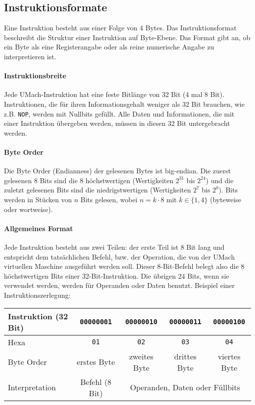 \subsection{Instruktionsformate}
\label{subsec:Instruktionsformate}

Eine Instruktion besteht aus einer Folge von 4 Bytes.
Das \gls{Instruktionsformat} beschreibt die Struktur einer Instruktion auf
Byte-Ebene. Das Format gibt an, ob ein Byte als eine Registerangabe oder als reine
numerische Angabe zu interpretieren ist.

\paragraph{Instruktionsbreite}
Jede UMach-Instruktion hat eine feste Bitlänge von 32 Bit (4 mal 8 Bit).
Instruktionen, die für ihren
Informationsgehalt weniger als 32 Bit brauchen, wie z.B. \texttt{NOP},
werden mit Nullbits gefüllt. Alle Daten und Informationen, die mit einer
Instruktion übergeben werden, müssen in diesen 32 Bit untergebracht werden.

\paragraph{Byte Order}
Die Byte Order (Endianness) der gelesenen \glspl{Byte} ist
big-endian. Die zuerst gelesenen 8 Bits sind die 8 höchstwertigen (Wertigkeiten
$2^{31}$ bis $2^{24}$) und die zuletzt gelesenen Bits sind die niedrigstwertigen
(Wertigkeiten $2^{7}$ bis $2^{0}$). Bits werden in Stücken von $n$ Bits gelesen,
wobei $n = k \cdot 8$ mit $k \in \{1, 4\}$ (byteweise oder wortweise).

\paragraph{Allgemeines Format}
Jede \gls{Instruktion} besteht aus zwei Teilen: der erste Teil ist
8 Bit lang und entspricht dem tatsächlichen \gls{Befehl}, bzw. der Operation,
die von der UMach virtuellen Maschine ausgeführt werden soll.
Dieser 8-Bit-Befehl belegt also die 8 höchstwertigen Bits einer
32-Bit-Instruktion.  Die übrigen 24 Bits, wenn sie verwendet werden, werden
für Operanden oder Daten benutzt. Beispiel einer Instruktionszerlegung:

\begin{center}
  \begin{tabular}{|l|*{4}{c|}}
    \hline
    Instruktion (32 Bit) &
    \texttt{00000001} & \texttt{00000010} & \texttt{00000011} & \texttt{00000100}
    \\\hline
    Hexa          &
    \texttt{01}   & \texttt{02}   & \texttt{03}   & \texttt{04}
    \\\hline
    Byte Order    &
    erstes Byte   & zweites Byte  & drittes Byte  & viertes Byte
    \\\hline
    Interpretation &
    Befehl (8 Bit) &  \multicolumn{3}{c|}{Operanden, Daten oder Füllbits}
    \\\hline
  \end{tabular}
\end{center}

